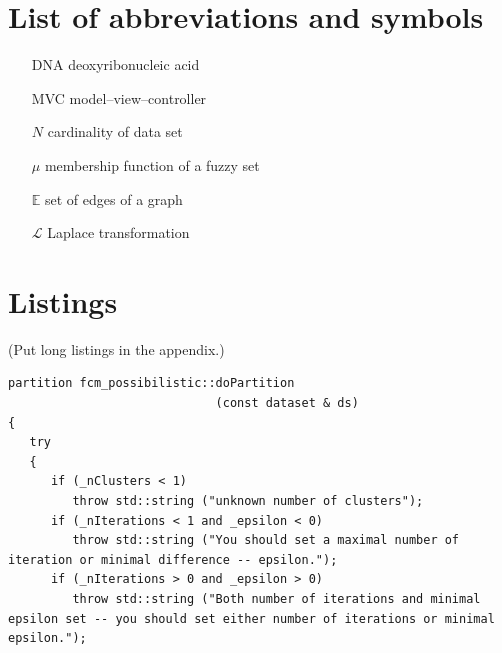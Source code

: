 \documentclass[a4paper,twoside,12pt]{book}
\newcounter{PagesWithoutNumbers}
\begin{document}
 

 


\backmatter
{}
\setcounter{page}{\value{PagesWithoutNumbers}}

\pagestyle{onlyPageNumbers}





\begin{appendices} 


 

\chapter*{List of abbreviations and symbols}

\begin{itemize}
\item[DNA] deoxyribonucleic acid
\item[MVC] model--view--controller 
\item[$N$] cardinality of data set
\item[$\mu$] membership function of a fuzzy set
\item[$\mathbb{E}$] set of edges of a graph
\item[$\mathcal{L}$] Laplace transformation
\end{itemize}


\chapter*{Listings}

(Put long listings in the appendix.)

\begin{lstlisting}
partition fcm_possibilistic::doPartition
                             (const dataset & ds)
{
   try
   {
      if (_nClusters < 1)
         throw std::string ("unknown number of clusters");
      if (_nIterations < 1 and _epsilon < 0)
         throw std::string ("You should set a maximal number of iteration or minimal difference -- epsilon.");
      if (_nIterations > 0 and _epsilon > 0)
         throw std::string ("Both number of iterations and minimal epsilon set -- you should set either number of iterations or minimal epsilon.");
   

\end{lstlisting}
\end{appendices}
\end{document}

